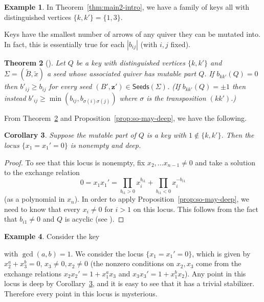 \documentclass{amsart}
\newcommand{\seed}{\Sigma}
\newcommand{\exmatrix}[1]{\widetilde{#1}}
\newcommand{\seeds}{\mathsf{Seeds}}
\numberwithin{equation}{section}
\newtheorem{theorem}{Theorem}[section]
\newtheorem{corollary}[theorem]{Corollary}
\theoremstyle{definition}
\newtheorem{example}[theorem]{Example}
\begin{document}
\begin{example}
In Theorem~\ref{thm:main2-intro}, we have a family of keys all with distinguished vertices $\{k,k'\} = \{1,3\}$.
\end{example}

Keys have the smallest number of arrows of any quiver they can be mutated into.
In fact, this is essentially true for each $|b_{ij}|$ (with $i,j$ fixed).

\begin{theorem}[{\cite[Lemmas~4.21 \& 4.23, cf. Corollary 4.24]{Ervin}}]\label{thm:keys-grow}
Let $Q$ be a key with distinguished vertices $\{k,k'\}$ and $\seed = (\exmatrix{B}, \exmatrix{x})$ a seed whose associated quiver has mutable part $Q$.
If $b_{kk'}(Q) = 0$ then $b'_{ij} \geq b_{ij}$ for every seed $(B', \mathbf{z}') \in \seeds(\seed)$.
(If $b_{kk'}(Q) = \pm 1$ then instead $b'_{ij} \geq \min(b_{ij}, b_{\sigma(i)\sigma(j)})$ where $\sigma$ is the transposition $(k k')$.)
\end{theorem}

From Theorem~\ref{thm:keys-grow} and Proposition~\ref{prop:so-may-deep}, we have the following.

\begin{corollary}\label{cor:keys-deep}
Suppose the mutable part of $Q$ is a key with $1 \not \in \{k, k'\}$.
Then the locus $\{x_1=x_1'=0\}$ is nonempty and deep. 
\end{corollary}

\begin{proof}
To see that this locus is nonempty, fix $x_2, \ldots x_{n-1} \neq 0$ and take a solution to the exchange relation 
\[0 = x_1 x_1' = \prod_{b_{i1} > 0
} x_i^{b_{i1}} + \prod_{b_{i1} < 0} x_i^{-b_{i1}}\] 
(as a polynomial in $x_n$).
In order to apply Proposition~\ref{prop:so-may-deep}, we need to know that every $x_i \neq 0$ for $i > 1$ on this locus. 
This follows from the fact that $b_{i1}\neq 0$ and $Q$ is acyclic (see \cite[Corollary 5.4]{muller}).
\end{proof}


\begin{example}
Consider the key 

\begin{center}
\end{center}
with $\gcd(a,b)=1$. We consider the locus $\{x_1 = x_1' = 0\}$, which is given by $x_2^{a}+x_3^{b} = 0$, $x_3 \neq 0, x_2 \neq 0$ (the nonzero conditions on $x_2, x_3$ come from the exchange relations $x_2x_2' = 1 + x_1^{a}x_3$ and $x_3x_3' = 1 + x_1^{b}x_2$).
Any point in this locus is deep by Corollary~\ref{cor:keys-deep}, and it is easy to see that it has a trivial stabilizer. %
Therefore every point in this locus is mysterious.
\end{example}
\end{document}
